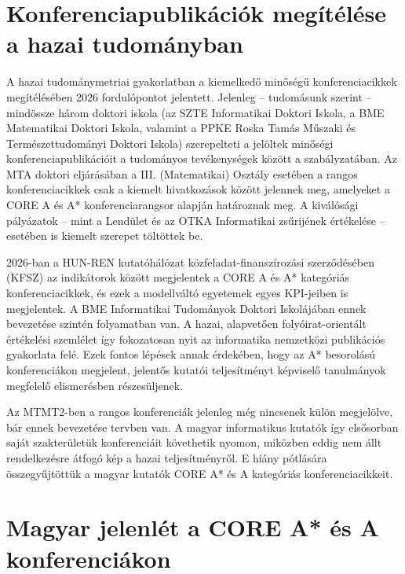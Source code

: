 \documentclass[12pt,a4paper]{article}
\begin{document}
\section{Konferenciapublikációk megítélése a hazai tudományban}

A hazai tudománymetriai gyakorlatban a kiemelkedő minőségű konferenciacikkek megítélésében 2026 fordulópontot jelentett. Jelenleg – tudomásunk szerint – mindössze három doktori iskola (az SZTE Informatikai Doktori Iskola, a BME Matematikai Doktori Iskola, valamint a PPKE Roska Tamás Műszaki és Természettudományi Doktori Iskola) szerepelteti a jelöltek minőségi konferenciapublikációit a tudományos tevékenységek között a szabályzatában. Az MTA doktori eljárásában a III. (Matematikai) Osztály esetében a rangos konferenciacikkek csak a kiemelt hivatkozások között jelennek meg, amelyeket a CORE A és A* konferenciarangsor alapján határoznak meg. A kiválósági pályázatok – mint a Lendület és az OTKA Informatikai zsűrijének értékelése – esetében is kiemelt szerepet töltöttek be.

2026-ban a HUN-REN kutatóhálózat közfeladat-finanszírozási szerződésében (KFSZ) az indikátorok között megjelentek a CORE A és A* kategóriás konferenciacikkek, és ezek a modellváltó egyetemek egyes KPI-jeiben is megjelentek. A BME Informatikai Tudományok Doktori Iskolájában ennek bevezetése szintén folyamatban van. A hazai, alapvetően folyóirat-orientált értékelési szemlélet így fokozatosan nyit az informatika nemzetközi publikációs gyakorlata felé. Ezek fontos lépések annak érdekében, hogy az A* besorolású konferenciákon megjelent, jelentős kutatói teljesítményt képviselő tanulmányok megfelelő elismerésben részesüljenek.

Az MTMT2-ben a rangos konferenciák jelenleg még nincsenek külön megjelölve, bár ennek bevezetése tervben van. A magyar informatikus kutatók így elsősorban saját szakterületük konferenciáit követhetik nyomon, miközben eddig nem állt rendelkezésre átfogó kép a hazai teljesítményről. E hiány pótlására összegyűjtöttük a magyar kutatók CORE A* és A kategóriás konferenciacikkeit.

\section{Magyar jelenlét a CORE A\!* és A konferenciákon}
\end{document}

